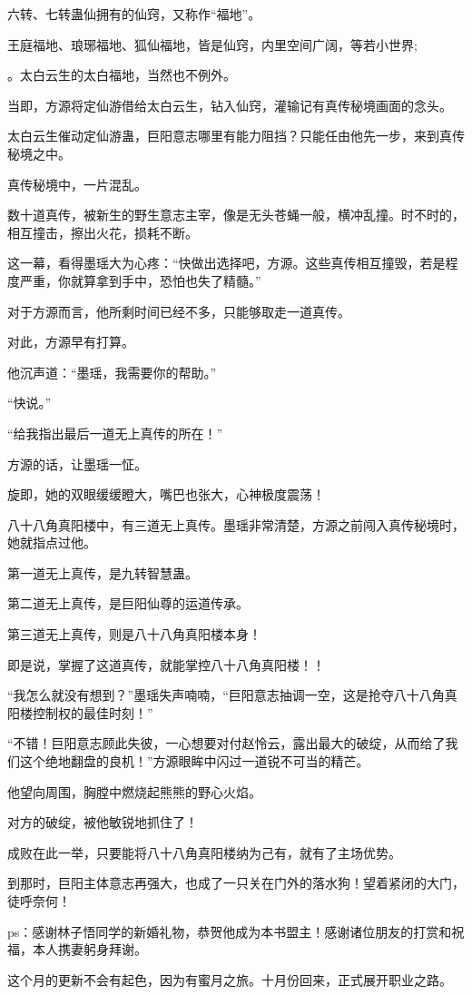 \begin{this_body}
六转、七转蛊仙拥有的仙窍，又称作“福地”。

王庭福地、琅琊福地、狐仙福地，皆是仙窍，内里空间广阔，等若小世界;

。太白云生的太白福地，当然也不例外。

当即，方源将定仙游借给太白云生，钻入仙窍，灌输记有真传秘境画面的念头。

太白云生催动定仙游蛊，巨阳意志哪里有能力阻挡？只能任由他先一步，来到真传秘境之中。

真传秘境中，一片混乱。

数十道真传，被新生的野生意志主宰，像是无头苍蝇一般，横冲乱撞。时不时的，相互撞击，擦出火花，损耗不断。

这一幕，看得墨瑶大为心疼：“快做出选择吧，方源。这些真传相互撞毁，若是程度严重，你就算拿到手中，恐怕也失了精髓。”

对于方源而言，他所剩时间已经不多，只能够取走一道真传。

对此，方源早有打算。

他沉声道：“墨瑶，我需要你的帮助。”

“快说。”

“给我指出最后一道无上真传的所在！”

方源的话，让墨瑶一怔。

旋即，她的双眼缓缓瞪大，嘴巴也张大，心神极度震荡！

八十八角真阳楼中，有三道无上真传。墨瑶非常清楚，方源之前闯入真传秘境时，她就指点过他。

第一道无上真传，是九转智慧蛊。

第二道无上真传，是巨阳仙尊的运道传承。

第三道无上真传，则是八十八角真阳楼本身！

即是说，掌握了这道真传，就能掌控八十八角真阳楼！！

“我怎么就没有想到？”墨瑶失声喃喃，“巨阳意志抽调一空，这是抢夺八十八角真阳楼控制权的最佳时刻！”

“不错！巨阳意志顾此失彼，一心想要对付赵怜云，露出最大的破绽，从而给了我们这个绝地翻盘的良机！”方源眼眸中闪过一道锐不可当的精芒。

他望向周围，胸膛中燃烧起熊熊的野心火焰。

对方的破绽，被他敏锐地抓住了！

成败在此一举，只要能将八十八角真阳楼纳为己有，就有了主场优势。

到那时，巨阳主体意志再强大，也成了一只关在门外的落水狗！望着紧闭的大门，徒呼奈何！

ps：感谢林子悟同学的新婚礼物，恭贺他成为本书盟主！感谢诸位朋友的打赏和祝福，本人携妻躬身拜谢。

这个月的更新不会有起色，因为有蜜月之旅。十月份回来，正式展开职业之路。

\end{this_body}


